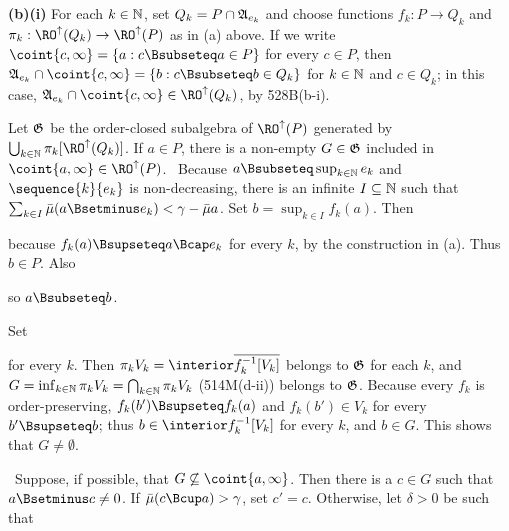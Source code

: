 {\medskip

{\bf (b)(i)}
For each $k\in\Bbb N$, set $Q_k=P\cap\frak A_{e_k}$ and
choose functions $f_k:P\to Q_k$
and $\pi_k:\RO^{\uparrow}(Q_k)\to\RO^{\uparrow}(P)$ as in (a)
above.   If we write
$\coint{c,\infty}=\{a:c\Bsubseteq a\in P\}$ for every $c\in P$, then
$\frak A_{e_k}\cap\coint{c,\infty}=\{b:c\Bsubseteq b\in Q_k\}$ for
$k\in\Bbb N$ and $c\in Q_k$;  in this case,
$\frak A_{e_k}\cap\coint{c,\infty}\in\RO^{\uparrow}(Q_k)$,
by 528B(b-i).

\medskip

 Let $\frak G$ be the order-closed subalgebra of
$\RO^{\uparrow}(P)$ generated by
$\bigcup_{k\in\Bbb N}\pi_k[\RO^{\uparrow}(Q_k)]$.   If $a\in P$, there is a
non-empty $G\in\frak G$ included in
$\coint{a,\infty}\in\RO^{\uparrow}(P)$.   \Prf\ Because
$a\Bsubseteq\sup_{k\in\Bbb N}e_k$ and $\sequence{k}{e_k}$ is
non-decreasing, there is an infinite $I\subseteq\Bbb N$ such that
$\sum_{k\in I}\bar\mu(a\Bsetminus e_k)<\gamma-\bar\mu a$.
Set $b=\sup_{k\in I}f_k(a)$.   Then


\noindent because $f_k(a)\Bsupseteq a\Bcap e_k$ for every $k$, by the
construction in (a).   Thus $b\in P$.   Also


\noindent so $a\Bsubseteq b$.

Set


\noindent for every $k$.   Then
$\pi_kV_k=\interior\overline{f_k^{-1}[V_k]}$ belongs to
$\frak G$ for each $k$, and
$G=\inf_{k\in\Bbb N}\pi_kV_k=\bigcap_{k\in\Bbb N}\pi_kV_k$
(514M(d-ii)) belongs to $\frak G$.
Because every $f_k$ is order-preserving,
$f_k(b')\Bsupseteq f_k(a)$ and $f_k(b')\in V_k$ for every
$b'\Bsupseteq b$;  thus
$b\in\interior f_k^{-1}[V_k]$ for every $k$, and $b\in G$.   This shows
that $G\ne\emptyset$.

\Quer\ Suppose, if possible, that $G\not\subseteq\coint{a,\infty}$.
Then there is a $c\in G$ such that $a\Bsetminus c\ne 0$.   If
$\bar\mu(c\Bcup a)>\gamma$, set $c'=c$.   Otherwise, let
$\delta>0$ be such that


}
